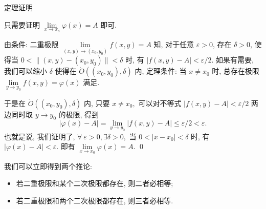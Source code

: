 
\begin{frame}{定理证明}

只需要证明 $\lim\limits_{x \to x_o} \varphi(x) = A$ 即可.

\pause
\vspace{0.5em}

由条件: 二重极限 $\lim\limits_{(x,y) \to (x_0, y_0)} f(x, y) = A$ 知, 对于任意 $\varepsilon > 0$, 存在 $\delta > 0$, 使得当 $0 < \lVert (x, y) - (x_0, y_0) \rVert < \delta$ 时, 有 $\lvert f(x, y) - A \rvert < \varepsilon / 2$. 如果有需要, 我们可以缩小 $\delta$ 使得在 $\mathring{O}((x_0, y_0), \delta)$ 内, 定理条件: 当 $x \neq x_0$ 时, 总存在极限 $\lim\limits_{y \to y_0} f(x, y) = \varphi(x)$ 满足.

\pause
\vspace{0.5em}

于是在 $\mathring{O}((x_0, y_0), \delta)$ 内, 只要 $x\neq x_0,$ 可以对不等式 $\lvert f(x, y) - A \rvert < \varepsilon / 2$ 两边同时取 $y \to y_0$ 的极限, 得到
\[\lvert \varphi(x) - A \rvert = \lim_{y \to y_0} \lvert f(x, y) - A \rvert \leqslant \varepsilon / 2 < \varepsilon.\]
也就是说, 我们证明了, $\forall~\varepsilon > 0, \exists \delta > 0,$ 当 $0 < \lvert x - x_0 \rvert < \delta$ 时, 有 $\lvert \varphi(x) - A \rvert < \varepsilon.$
即有 $\lim\limits_{x \to x_0} \varphi(x) = A.$
\qed

\pause
\vspace{0.5em}

我们可以立即得到两个推论:
\begin{itemize}
\item 若二重极限和某个二次极限都存在, 则二者必相等;
\pause
\item 若二重极限和两个二次极限都存在, 则三者必相等.
\end{itemize}

\end{frame}


